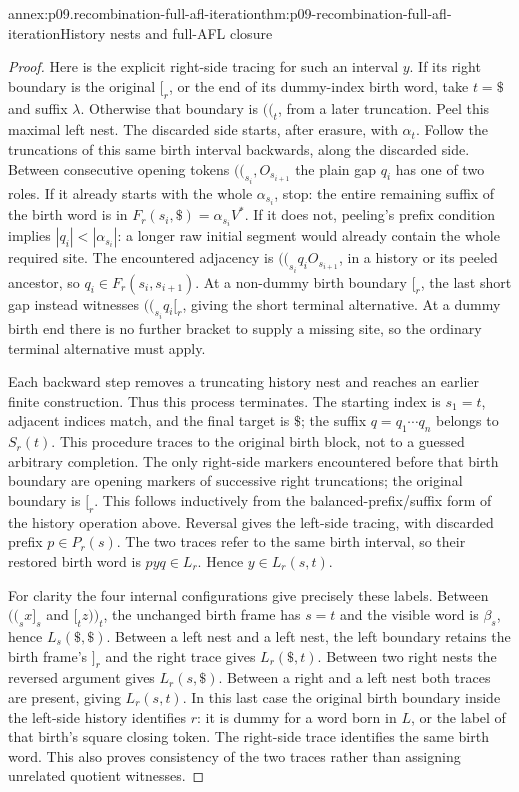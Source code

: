 \begin{annexitem}{annex:p09.recombination-full-afl-iteration}{thm:p09-recombination-full-afl-iteration}{History nests and full-AFL closure}
\begin{proof}
Here is the explicit right-side tracing for such an interval \(y\).
If its right boundary is the original \([_r\), or the end of its
dummy-index birth word, take \(t=\$\) and suffix \(\lambda\).
Otherwise that boundary is \(\mathopen{(\!(}_t\), from a later truncation.
Peel this maximal left nest. The discarded side starts, after erasure,
with \(\alpha_t\). Follow the truncations of this same birth interval
backwards, along the discarded side. Between consecutive opening tokens
\(\mathopen{(\!(}_{s_i},O_{s_{i+1}}\) the plain gap \(q_i\) has one of two roles.
If it already starts with the whole \(\alpha_{s_i}\), stop: the
entire remaining suffix of the birth word is in
\(F_r(s_i,\$)=\alpha_{s_i}V^*\).
If it does not, peeling's prefix condition implies
\(|q_i|<|\alpha_{s_i}|\): a longer raw initial segment would already
contain the whole required site. The encountered adjacency is
\(\mathopen{(\!(}_{s_i}q_iO_{s_{i+1}}\), in a history or its peeled ancestor,
so \(q_i\in F_r(s_i,s_{i+1})\).
At a non-dummy birth boundary \([_r\), the last short gap instead
witnesses \(\mathopen{(\!(}_{s_i}q_i[_r\), giving the short terminal alternative.
At a dummy birth end there is no further bracket to supply a missing site,
so the ordinary terminal alternative must apply.

Each backward step removes a truncating history nest and reaches an earlier
finite construction. Thus this process terminates. The starting index is
\(s_1=t\), adjacent indices match, and the final target is \(\$\);
the suffix \(q=q_1\cdots q_n\) belongs to \(S_r(t)\).
This procedure traces to the original birth block, not to a guessed
arbitrary completion. The only right-side markers encountered before
that birth boundary are opening markers of successive right truncations;
the original boundary is \([_r\). This follows inductively from the
balanced-prefix/suffix form of the history operation above.
Reversal gives the left-side tracing, with discarded prefix
\(p\in P_r(s)\). The two traces refer to the same birth interval, so
their restored birth word is \(pyq\in L_r\).
Hence \(y\in L_r(s,t)\).

For clarity the four internal configurations give precisely these labels.
Between \(\mathopen{(\!(}_sx]_s\) and \([_tz\mathclose{)\!)}_t\), the unchanged birth frame has
\(s=t\) and the visible word is \(\beta_s\), hence \(L_s(\$,\$)\).
Between a left nest and a left nest, the left boundary retains the
birth frame's \(]_r\) and the right trace gives \(L_r(\$,t)\).
Between two right nests the reversed argument gives \(L_r(s,\$)\).
Between a right and a left nest both traces are present, giving
\(L_r(s,t)\). In this last case the original birth boundary inside the
left-side history identifies \(r\): it is dummy for a word born in \(L\),
or the label of that birth's square closing token. The right-side trace
identifies the same birth word. This also proves consistency of the two
traces rather than assigning unrelated quotient witnesses.


\end{proof}
\end{annexitem}
